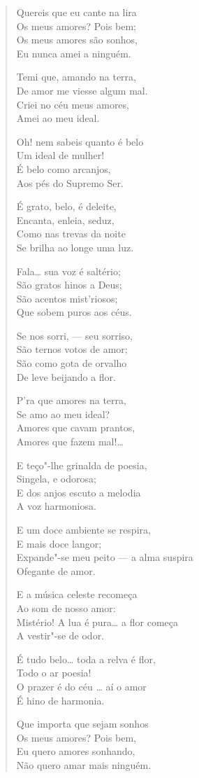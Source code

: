 \begin{verse}
Quereis que eu cante na lira\\
Os meus amores? Pois bem;\\
Os meus amores são sonhos,\\
Eu nunca amei a ninguém.

Temi que, amando na terra,\\
De amor me viesse algum mal.\\
Criei no céu meus amores,\\
Amei ao meu ideal.

Oh! nem sabeis quanto é belo\\
Um ideal de mulher!\\
É belo como arcanjos,\\
Aos pés do Supremo Ser.

É grato, belo, é deleite,\\
Encanta, enleia, seduz,\\
Como nas trevas da noite\\
Se brilha ao longe uma luz.

Fala\ldots{} sua voz é saltério;\\
São gratos hinos a Deus;\\
São acentos mist'riosos;\\
Que sobem puros aos céus.

Se nos sorri, --- seu sorriso,\\
São ternos votos de amor;\\
São como gota de orvalho\\
De leve beijando a flor.

P'ra que amores na terra,\\
Se amo ao meu ideal?\\
Amores que cavam prantos,\\
Amores que fazem mal!\ldots{}

E teço"-lhe grinalda de poesia,\\
Singela, e odorosa;\\
E dos anjos escuto a melodia\\
A voz harmoniosa.

E um doce ambiente se respira,\\
E mais doce langor;\\
Expande"-se meu peito --- a alma suspira\\
Ofegante de amor.

E a música celeste recomeça\\
Ao som de nosso amor:\\
Mistério! A lua é pura\ldots{} a flor começa\\
A vestir"-se de odor.

É tudo belo\ldots{} toda a relva é flor,\\
Todo o ar poesia!\\
O prazer é do céu \ldots{} aí o amor\\
É hino de harmonia.

Que importa que sejam sonhos\\
Os meus amores? Pois bem,\\
Eu quero amores sonhando,\\
Não quero amar mais ninguém.
\end{verse}

